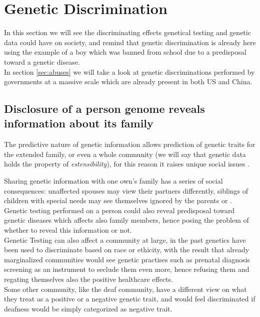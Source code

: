\documentclass[12pt]{article}
\begin{document}
\newpage
\section{Genetic Discrimination}
\label{sec:discrimination}
In this section we will see the discriminating effects genetical testing and genetic data could have on society, and remind that genetic discrimination is already here using 
the example of a boy which was banned from school due to a predisposal toward a genetic disease.\\
In section \ref{sec:abuses} we will take a look at genetic discriminations performed by governments at a massive scale which are already present in both US and China.
\subsection{Disclosure of a person genome reveals information about its family}
The predictive nature of genetic information allows prediction of genetic traits for the extended family, or even a whole community (we will say that genetic data holds the property of \emph{estensibility}), for this reason it raises unique social issues \cite{understanding_genetics}.

Sharing genetic information with one own's family has a series of social consequences: 
unaffected spouses may view their partners differently, siblings of children with special needs may see themselves ignored by the parents or \cite{understanding_genetics}.\\
Genetic testing performed on a person could also reveal predisposal toward genetic diseases which affects also family members, hence posing the problem of whether to reveal this information or not.\\
Genetic Testing can also affect a community at large, in the past genetics have been used to discriminate based on race or ethicity, 
with the result that already marginalized communities would see genetic practises such as prenatal diagnosis screening as an instrument to seclude them even more, hence refusing them 
and regating themselves also the positive healthcare effects.\\
Some other community, like the deaf community, have a different view on what they treat as a positive or a negative genetic trait,
 and would feel discriminated if deafness would be simply categorized as negative trait. \cite{genetic_data_misuse}\\
\end{document}
